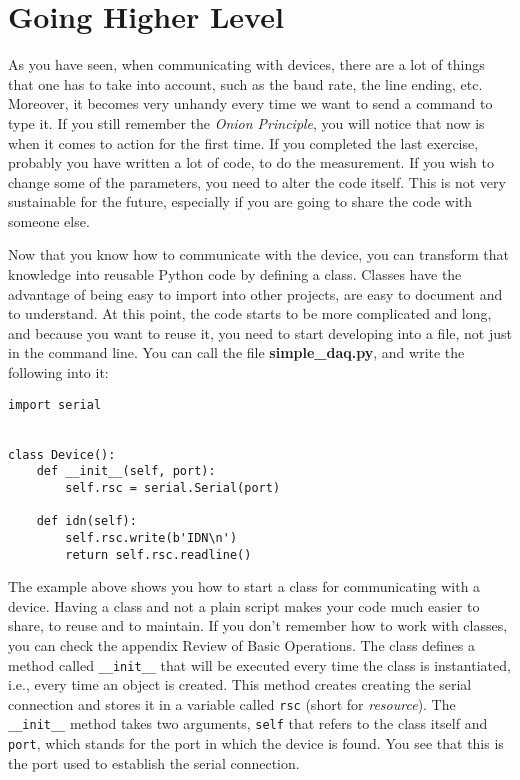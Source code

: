 \section{Going Higher Level}\label{going-higherlevel}
As you have seen, when communicating with devices, there are a lot of
things that one has to take into account, such as the baud rate, the
line ending, etc. Moreover, it becomes very unhandy every time we want
to send a command to type it. If you still remember the \emph{Onion
Principle}, you will notice that now is when it comes to action for the
first time. If you completed the last exercise, probably you have
written a lot of code, to do the measurement. If you wish to change some
of the parameters, you need to alter the code itself. This is not very
sustainable for the future, especially if you are going to share the
code with someone else.

Now that you know how to communicate with the device, you can transform
that knowledge into reusable Python code by defining a class. Classes
have the advantage of being easy to import into other projects, are easy
to document and to understand. At this point, the code starts to be more
complicated and long, and because you want to reuse it, you need to
start developing into a file, not just in the command line. You can call
the file \textbf{simple\_daq.py}, and write the following into it:

\begin{verbatim}
import serial


class Device():
    def __init__(self, port):
        self.rsc = serial.Serial(port)

    def idn(self):
        self.rsc.write(b'IDN\n')
        return self.rsc.readline()
\end{verbatim}

The example above shows you how to start a class for communicating with
a device. Having a class and not a plain script makes your code much
easier to share, to reuse and to maintain. If you don't remember how to
work with classes, you can check the appendix Review of Basic
Operations. The class defines a method called \texttt{\_\_init\_\_}
that will be executed every time the class is instantiated, i.e., every
time an object is created. This method creates creating the serial
connection and stores it in a variable called \texttt{rsc} (short for
\emph{resource}). The \texttt{\_\_init\_\_} method takes two arguments,
\texttt{self} that refers to the class itself and \texttt{port}, which
stands for the port in which the device is found. You see that this is
the port used to establish the serial connection.

